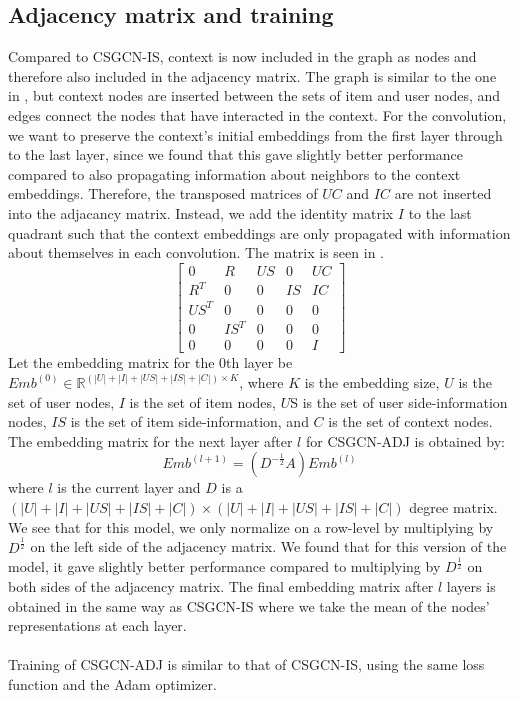\subsection{Adjacency matrix and training}\label{subsec:csgcn_adj_adj_mat}
Compared to CSGCN-IS, context is now included in the graph as nodes and therefore also included in the adjacency matrix.
The graph is similar to the one in , but context nodes are inserted between the sets of item and user nodes, and edges connect the nodes that have interacted in the context.
For the convolution, we want to preserve the context's initial embeddings from the first layer through to the last layer, since we found that this gave slightly better performance compared to also propagating information about neighbors to the context embeddings.
Therefore, the transposed matrices of $UC$ and $IC$ are not inserted into the adjacancy matrix.
Instead, we add the identity matrix $I$ to the last quadrant such that the context embeddings are only propagated with information about themselves in each convolution.
The matrix is seen in .
\begin{equation}\label{csgcn_adj_adj_mat}
    \begin{bmatrix}
    0 & R & US & 0 & UC\\
    R^T & 0 & 0 & IS & IC\\
    US^T & 0 & 0 & 0 & 0\\
    0 & IS^T & 0 & 0 & 0 \\
    0 & 0 & 0 & 0 & I
    \end{bmatrix}
\end{equation}
Let the embedding matrix for the 0th layer be $Emb^{(0)} \in \mathbb{R}^{(|U| + |I| + |US| + |IS| + |C|) \times K}$, where $K$ is the embedding size, $U$ is the set of user nodes, $I$ is the set of item nodes, $U$S is the set of user side-information nodes, $IS$ is the set of item side-information, and $C$ is the set of context nodes. The embedding matrix for the next layer after $l$ for CSGCN-ADJ is obtained by:
\begin{equation}
    Emb^{(l+1)} = (D^{-\frac{1}{2}}A)Emb^{(l)}
\end{equation}
where $l$ is the current layer and $D$ is a $(|U| + |I| + |US| + |IS| + |C|) \times (|U| + |I| + |US| + |IS|+ |C|)$ degree matrix. 
We see that for this model, we only normalize on a row-level by multiplying by $D^{\frac{1}{2}}$ on the left side of the adjacency matrix.
We found that for this version of the model, it gave slightly better performance compared to multiplying by $D^{\frac{1}{2}}$ on both sides of the adjacency matrix.
The final embedding matrix after $l$ layers is obtained in the same way as CSGCN-IS where we take the mean of the nodes' representations at each layer.
\\\\
Training of CSGCN-ADJ is similar to that of CSGCN-IS, using the same loss function and the Adam optimizer.
